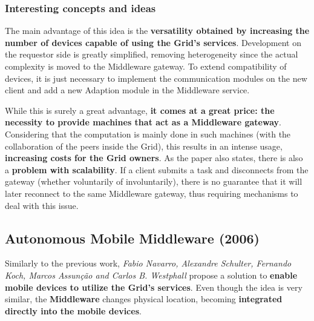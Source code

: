 \subsubsection{Interesting concepts and ideas}
The main advantage of this idea is the \textbf{versatility obtained by increasing the number of devices capable of using the Grid's services}. Development on the requestor side is greatly simplified, removing heterogeneity since the actual complexity is moved to the Middleware gateway. To extend compatibility of devices, it is just necessary to implement the communication modules on the new client and add a new Adaption module in the Middleware service.

While this is surely a great advantage, \textbf{it comes at a great price: the necessity to provide machines that act as a Middleware gateway}. Considering that the computation is mainly done in such machines (with the collaboration of the peers inside the Grid), this results in an intense usage, \textbf{increasing costs for the Grid owners}.
As the paper also states, there is also a \textbf{problem with scalability}. If a client submits a task and disconnects from the gateway (whether voluntarily of involuntarily), there is no guarantee that it will later reconnect to the same Middleware gateway, thus requiring mechanisms to deal with this issue.

\subsection{Autonomous Mobile Middleware (2006)}
Similarly to the previous work, \textit{Fabio Navarro, Alexandre Schulter, Fernando Koch, Marcos Assunção and Carlos B. Westphall} propose a solution to \textbf{enable mobile devices to utilize the Grid's services}. Even though the idea is very similar, the \textbf{Middleware} changes physical location, becoming \textbf{integrated directly into the mobile devices}.

